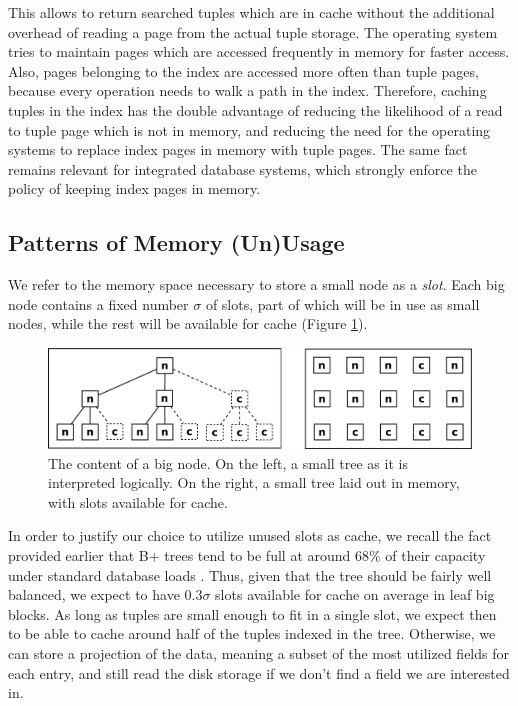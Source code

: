 \documentclass{article}
\begin{document}
This allows to return searched tuples which are in cache without the additional overhead of reading a page from
the actual tuple storage.
The operating system tries to maintain pages which are accessed frequently in memory for faster
access.
Also, pages belonging to the index are accessed more often than tuple pages, because every operation
needs to walk a path in the index.
Therefore, caching tuples in the index has the double advantage of reducing the likelihood
of a read to tuple page which is not in memory, and reducing the need for the operating systems
to replace index pages in memory with tuple pages.
The same fact remains relevant for integrated database systems, which strongly enforce the policy of keeping
index pages in memory.


\subsection{Patterns of Memory (Un)Usage}

We refer to the memory space necessary to store a small node as a \textit{slot}.
Each big node contains a fixed number $\sigma$ of slots, part of which will be in use
as small nodes, while the rest will be available for cache (Figure \ref{fig:inner_block}).
\begin{figure}[h]
\begin{center}
\includegraphics[width=350pt]{inner_block}
\end{center}
\caption{
The content of a big node.
On the left, a small tree as it is interpreted logically.
On the right, a small tree laid out in memory, with slots available for cache.
}
\label{fig:inner_block}
\end{figure}

In order to justify our choice to utilize unused slots as cache,
we recall the fact provided earlier that
B+ trees tend to be full at around 68\% of their capacity under standard database loads \citep{Wu:2011}.
Thus, given that the tree should be fairly well balanced,
we expect to have $0.3 \sigma$ slots available for cache on average in leaf big blocks.
As long as tuples are small enough to fit in a single slot,
we expect then to be able to cache around half of the tuples indexed in the tree.
Otherwise, we can store a projection of the data, meaning a subset of the most utilized fields for each entry,
and still read the disk storage if we don't find a field we are interested in.
\end{document}
